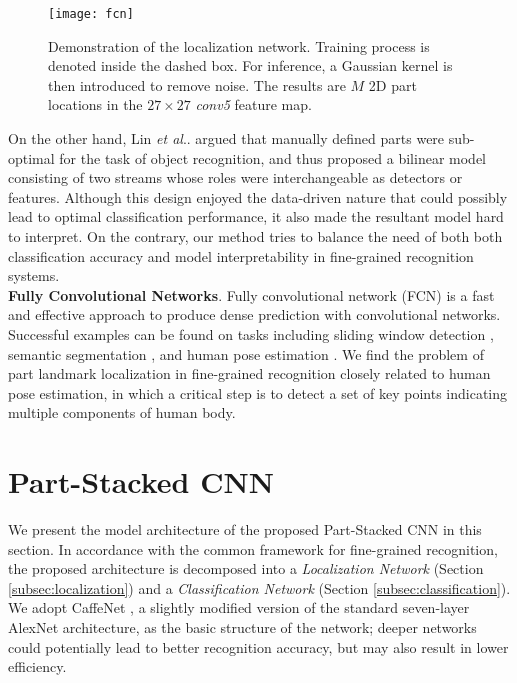 \documentclass[10pt,twocolumn,letterpaper]{article}
\makeatletter
\DeclareRobustCommand\onedot{\futurelet\@let@token\@onedot}
\def\@onedot{\ifx\@let@token.\else.\null\fi\xspace}
\def\etal{\emph{et al}\onedot}
\makeatother
\begin{document}
\begin{figure*}[t]
\begin{center}
\texttt{[image: fcn]}
\end{center}
   \caption{Demonstration of the localization network. Training process is denoted inside the dashed box. For inference, a Gaussian kernel is then introduced to remove noise. The results are $M$ 2D part locations in the $27\times27$ \textit{conv5} feature map.}
\label{fig:fcn}
\end{figure*}



On the other hand, Lin \etal \cite{lin2015bilinear} argued that manually defined parts were sub-optimal for the task of object recognition, and thus proposed a bilinear model consisting of two streams whose roles were interchangeable as detectors or features. Although this design enjoyed the data-driven nature that could possibly lead to optimal classification performance, it also made the resultant model hard to interpret. On the contrary, our method tries to balance the need of both both classification accuracy and model interpretability in fine-grained recognition systems. \\














\noindent\textbf{Fully Convolutional Networks}.
Fully convolutional network (FCN) is a fast and effective approach to produce dense prediction with convolutional networks. Successful examples can be found on tasks including sliding window detection \cite{sermanet2013overfeat}, semantic segmentation \cite{long2015fully}, and human pose estimation \cite{tompson2014joint}. We find the problem of part landmark localization in fine-grained recognition closely related to human pose estimation, in which a critical step is to detect a set of key points indicating multiple components of human body.








\section{Part-Stacked CNN} \label{sec:pscnn}




We present the model architecture of the proposed Part-Stacked CNN in this section. In accordance with the common framework for fine-grained recognition, the proposed architecture is decomposed into a \emph{Localization Network} (Section \ref{subsec:localization}) and a \emph{Classification Network} (Section \ref{subsec:classification}). 
We adopt CaffeNet \cite{jia2014caffe}, a slightly modified version of the standard seven-layer AlexNet \cite{krizhevsky2012imagenet} architecture, as the basic structure of the network; deeper networks could potentially lead to better recognition accuracy, but may also result in lower efficiency. 
\end{document}

